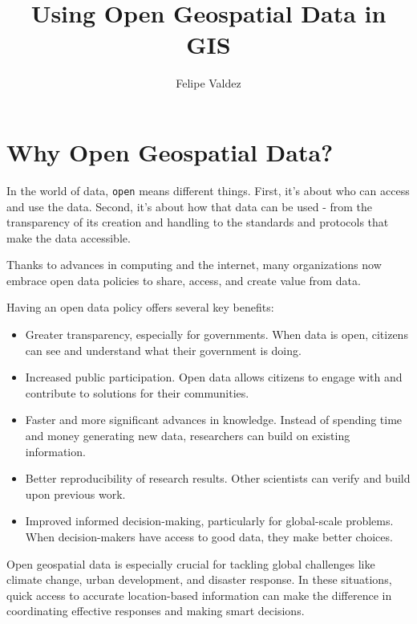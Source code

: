 \documentclass[
  letterpaper,
  DIV=11,
  numbers=noendperiod]{scrartcl}
\title{Using Open Geospatial Data in GIS}
\author{Felipe Valdez}
\date{}
\renewcommand*\contentsname{Table of contents}
\newcommand\contentsname{Table of contents}
\begin{document}
\maketitle

\renewcommand*\contentsname{Contents}
{
\hypersetup{linkcolor=}
\setcounter{tocdepth}{4}
\tableofcontents
}

\section{Why Open Geospatial Data?}\label{why-open-geospatial-data}

In the world of data, \texttt{open} means different things. First, it's
about who can access and use the data. Second, it's about how that data
can be used - from the transparency of its creation and handling to the
standards and protocols that make the data accessible.

Thanks to advances in computing and the internet, many organizations now
embrace open data policies to share, access, and create value from data.

Having an open data policy offers several key benefits:

\begin{itemize}
\item
  Greater transparency, especially for governments. When data is open,
  citizens can see and understand what their government is doing.
\item
  Increased public participation. Open data allows citizens to engage
  with and contribute to solutions for their communities.
\item
  Faster and more significant advances in knowledge. Instead of spending
  time and money generating new data, researchers can build on existing
  information.
\item
  Better reproducibility of research results. Other scientists can
  verify and build upon previous work.
\item
  Improved informed decision-making, particularly for global-scale
  problems. When decision-makers have access to good data, they make
  better choices.
\end{itemize}

Open geospatial data is especially crucial for tackling global
challenges like climate change, urban development, and disaster
response. In these situations, quick access to accurate location-based
information can make the difference in coordinating effective responses
and making smart decisions.
\end{document}
